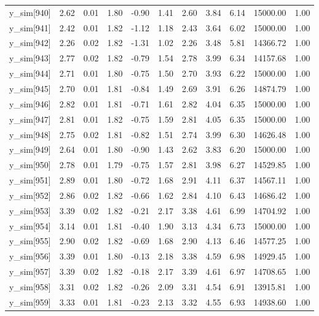 \begin{table}[ht]
\begin{tabular}{rrrrrrrrrrr}
  y\_sim[940] & 2.62 & 0.01 & 1.80 & -0.90 & 1.41 & 2.60 & 3.84 & 6.14 & 15000.00 & 1.00 \\ 
  y\_sim[941] & 2.42 & 0.01 & 1.82 & -1.12 & 1.18 & 2.43 & 3.64 & 6.02 & 15000.00 & 1.00 \\ 
  y\_sim[942] & 2.26 & 0.02 & 1.82 & -1.31 & 1.02 & 2.26 & 3.48 & 5.81 & 14366.72 & 1.00 \\ 
  y\_sim[943] & 2.77 & 0.02 & 1.82 & -0.79 & 1.54 & 2.78 & 3.99 & 6.34 & 14157.68 & 1.00 \\ 
  y\_sim[944] & 2.71 & 0.01 & 1.80 & -0.75 & 1.50 & 2.70 & 3.93 & 6.22 & 15000.00 & 1.00 \\ 
  y\_sim[945] & 2.70 & 0.01 & 1.81 & -0.84 & 1.49 & 2.69 & 3.91 & 6.26 & 14874.79 & 1.00 \\ 
  y\_sim[946] & 2.82 & 0.01 & 1.81 & -0.71 & 1.61 & 2.82 & 4.04 & 6.35 & 15000.00 & 1.00 \\ 
  y\_sim[947] & 2.81 & 0.01 & 1.82 & -0.75 & 1.59 & 2.81 & 4.05 & 6.35 & 15000.00 & 1.00 \\ 
  y\_sim[948] & 2.75 & 0.02 & 1.81 & -0.82 & 1.51 & 2.74 & 3.99 & 6.30 & 14626.48 & 1.00 \\ 
  y\_sim[949] & 2.64 & 0.01 & 1.80 & -0.90 & 1.43 & 2.62 & 3.83 & 6.20 & 15000.00 & 1.00 \\ 
  y\_sim[950] & 2.78 & 0.01 & 1.79 & -0.75 & 1.57 & 2.81 & 3.98 & 6.27 & 14529.85 & 1.00 \\ 
  y\_sim[951] & 2.89 & 0.01 & 1.80 & -0.72 & 1.68 & 2.91 & 4.11 & 6.37 & 14567.11 & 1.00 \\ 
  y\_sim[952] & 2.86 & 0.02 & 1.82 & -0.66 & 1.62 & 2.84 & 4.10 & 6.43 & 14686.42 & 1.00 \\ 
  y\_sim[953] & 3.39 & 0.02 & 1.82 & -0.21 & 2.17 & 3.38 & 4.61 & 6.99 & 14704.92 & 1.00 \\ 
  y\_sim[954] & 3.14 & 0.01 & 1.81 & -0.40 & 1.90 & 3.13 & 4.34 & 6.73 & 15000.00 & 1.00 \\ 
  y\_sim[955] & 2.90 & 0.02 & 1.82 & -0.69 & 1.68 & 2.90 & 4.13 & 6.46 & 14577.25 & 1.00 \\ 
  y\_sim[956] & 3.39 & 0.01 & 1.80 & -0.13 & 2.18 & 3.38 & 4.59 & 6.98 & 14929.45 & 1.00 \\ 
  y\_sim[957] & 3.39 & 0.02 & 1.82 & -0.18 & 2.17 & 3.39 & 4.61 & 6.97 & 14708.65 & 1.00 \\ 
  y\_sim[958] & 3.31 & 0.02 & 1.82 & -0.26 & 2.09 & 3.31 & 4.54 & 6.91 & 13915.81 & 1.00 \\ 
  y\_sim[959] & 3.33 & 0.01 & 1.81 & -0.23 & 2.13 & 3.32 & 4.55 & 6.93 & 14938.60 & 1.00 \\ 

\end{tabular}
\end{table}
